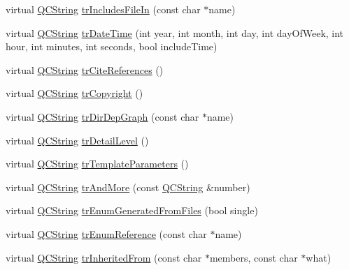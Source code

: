 \begin{DoxyCompactItemize}
\item 
virtual \mbox{\hyperlink{class_q_c_string}{Q\+C\+String}} \mbox{\hyperlink{class_translator_italian_ab672d5c6610c57b8abcedfc8bea00b10}{tr\+Includes\+File\+In}} (const char $\ast$name)
\item 
virtual \mbox{\hyperlink{class_q_c_string}{Q\+C\+String}} \mbox{\hyperlink{class_translator_italian_ac09695d9dcfda40eadace52441635d10}{tr\+Date\+Time}} (int year, int month, int day, int day\+Of\+Week, int hour, int minutes, int seconds, bool include\+Time)
\item 
virtual \mbox{\hyperlink{class_q_c_string}{Q\+C\+String}} \mbox{\hyperlink{class_translator_italian_a85919834b6b72e9dd99543dd396172dd}{tr\+Cite\+References}} ()
\item 
virtual \mbox{\hyperlink{class_q_c_string}{Q\+C\+String}} \mbox{\hyperlink{class_translator_italian_ae256a7ad876bde0aef55eaaabcc6d794}{tr\+Copyright}} ()
\item 
virtual \mbox{\hyperlink{class_q_c_string}{Q\+C\+String}} \mbox{\hyperlink{class_translator_italian_aec757bee06a313f82e17748fa0c72cb2}{tr\+Dir\+Dep\+Graph}} (const char $\ast$name)
\item 
virtual \mbox{\hyperlink{class_q_c_string}{Q\+C\+String}} \mbox{\hyperlink{class_translator_italian_ac0e1e2c20e38faf820b45b09e589625f}{tr\+Detail\+Level}} ()
\item 
virtual \mbox{\hyperlink{class_q_c_string}{Q\+C\+String}} \mbox{\hyperlink{class_translator_italian_a9cb99a813d2e67651e723be6065e3190}{tr\+Template\+Parameters}} ()
\item 
virtual \mbox{\hyperlink{class_q_c_string}{Q\+C\+String}} \mbox{\hyperlink{class_translator_italian_a776e83ad4d9ba9d59696dd9256b4b1b8}{tr\+And\+More}} (const \mbox{\hyperlink{class_q_c_string}{Q\+C\+String}} \&number)
\item 
virtual \mbox{\hyperlink{class_q_c_string}{Q\+C\+String}} \mbox{\hyperlink{class_translator_italian_ad35aa813efa08328798c0370df1243d0}{tr\+Enum\+Generated\+From\+Files}} (bool single)
\item 
virtual \mbox{\hyperlink{class_q_c_string}{Q\+C\+String}} \mbox{\hyperlink{class_translator_italian_a861e5aa87281c24e9d65e69734901e8d}{tr\+Enum\+Reference}} (const char $\ast$name)
\item 
virtual \mbox{\hyperlink{class_q_c_string}{Q\+C\+String}} \mbox{\hyperlink{class_translator_italian_a1273a94f19d2d30d84f5ca52022bea84}{tr\+Inherited\+From}} (const char $\ast$members, const char $\ast$what)
\item 

\end{DoxyCompactItemize}
